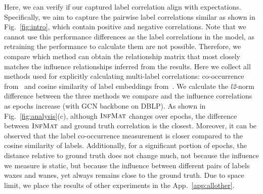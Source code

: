 Here, we can verify if our captured label correlation align with expectations.
Specifically, we aim to capture the pairwise label correlations similar as shown in Fig.~\ref{fig:intro}, which contain positive and negative correlations. 
Note that we cannot use this performance differences as the label correlations in the model, as retraining the performance to calculate them are not possible.
Therefore, we compare which method can obtain the relationship matrix that most closely matches the influence relationships inferred from the results.
Here we collect all methods used for explicitly calculating multi-label correlations: co-occurrence from~\citep{wang2023deep} and cosine similarity of label embeddings from~\citep{xu2018semi}.
We calculate the \textit{l2}-norm difference between the three methods we compare and the influence correlations as epochs increase (with GCN backbone on DBLP).
As shown in Fig.~\ref{fig:analysis}(c), although $\textsc{InfMat}$ changes over epochs, the difference between $\textsc{InfMat}$ and ground truth correlation is the closest. 
Moreover, it can be observed that the label co-occurrence measurement is closer compared to the cosine similarity of labels.
Additionally, for a significant portion of epochs, the distance relative to ground truth does not change much, not because the influence we measure is static, but because the influence between different pairs of labels waxes and wanes, yet always remains close to the ground truth. 
Due to space limit, we place the results of other experiments in the App.~\ref{app:allother}.






